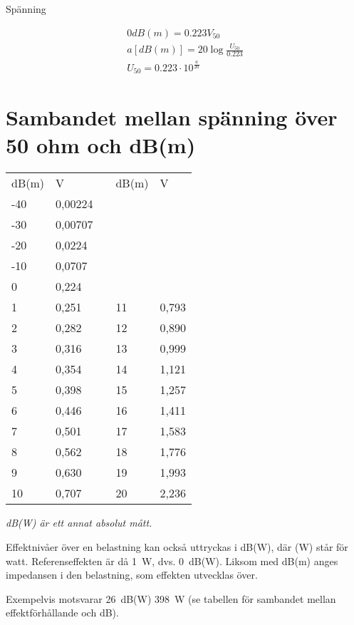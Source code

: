 Spänning

\begin{gather*}
  0 dB(m) = 0.223 V_{50} \\
  a [dB(m)] = 20 \log\frac{U_{50}}{0.223} \\
  U_{50} = 0.223 \cdot 10^{\frac{a}{20}}
\end{gather*}

\section{Sambandet mellan spänning över 50 ohm och dB(m)}
\begin{tabular}{l|lp{1cm}l|l}
  dB(m) & V & & dB(m) & V \\
  \cline{1-2} \cline{4-5}
  -40 & 0,00224 & & & \\
  -30 & 0,00707 & & & \\
  -20 & 0,0224  & & & \\
  -10 & 0,0707  & & & \\
  0   & 0,224   & & & \\
  1   & 0,251   & & 11 & 0,793 \\
  2   & 0,282   & & 12 & 0,890 \\
  3   & 0,316   & & 13 & 0,999 \\
  4   & 0,354   & & 14 & 1,121 \\
  5   & 0,398   & & 15 & 1,257 \\
  6   & 0,446   & & 16 & 1,411 \\
  7   & 0,501   & & 17 & 1,583 \\
  8   & 0,562   & & 18 & 1,776 \\
  9   & 0,630   & & 19 & 1,993 \\
  10  & 0,707   & & 20 & 2,236 \\
\end{tabular}

\emph{dB(W) är ett annat absolut mått.}

Effektnivåer över en belastning kan också uttryckas i dB(W), där (W)
står för watt. Referenseffekten är då 1~W, dvs. 0~dB(W). Liksom med
dB(m) anges impedansen i den belastning, som effekten utvecklas över.

Exempelvis motsvarar 26~dB(W) 398~W (se tabellen för sambandet mellan
effektförhållande och dB).

